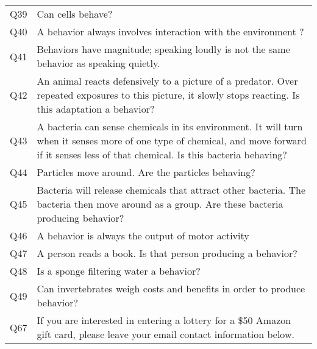 \begin{tabular}{ll}
Q39                   &                                                                                                                                                                                          Can cells behave? \\
Q40                   &                                                                                                                                              A behavior always involves interaction with the environment ? \\
Q41                   &                                                                                                                    Behaviors have magnitude; speaking loudly is not the same behavior as speaking quietly. \\
Q42                   &                                                 An animal reacts defensively to a picture of a predator. Over repeated exposures to this picture, it slowly stops reacting. Is this adaptation a behavior? \\
Q43                   &               A bacteria can sense chemicals in its environment. It will turn when it senses more of one type of chemical, and move forward if it senses less of that chemical. Is this bacteria behaving? \\
Q44                   &                                                                                                                                                         Particles move around. Are the particles behaving? \\
Q45                   &                                                              Bacteria will release chemicals that attract other bacteria. The bacteria then move around as a group. Are these bacteria producing behavior? \\
Q46                   &                                                                                                                                                          A behavior is always the output of motor activity \\
Q47                   &                                                                                                                                                A person reads a book. Is that person producing a behavior? \\
Q48                   &                                                                                                                                                                    Is a sponge filtering water a behavior? \\
Q49                   &                                                                                                                                   Can invertebrates weigh costs and benefits in order to produce behavior? \\
Q67                   &                                                                                 If you are interested in entering a lottery for a \$50 Amazon gift card, please leave your email contact information below. \\
\bottomrule
\end{tabular}
